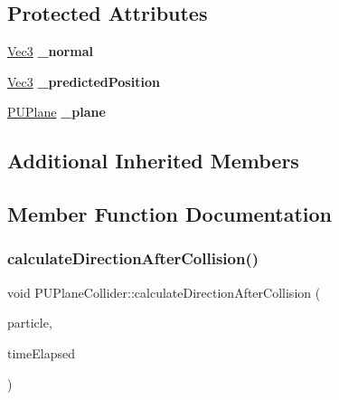 \subsection*{Protected Attributes}
\begin{DoxyCompactItemize}
\item 
\mbox{\label{classPUPlaneCollider_a709b66680d5834f6a34ff36afb84b3ce}} 
\hyperlink{classVec3}{Vec3} {\bfseries \+\_\+normal}
\item 
\mbox{\label{classPUPlaneCollider_a73019b39b34812c43d5353cbd918e3fe}} 
\hyperlink{classVec3}{Vec3} {\bfseries \+\_\+predicted\+Position}
\item 
\mbox{\label{classPUPlaneCollider_ae102585a363636619a848ddfe4a886dd}} 
\hyperlink{classPUPlane}{P\+U\+Plane} {\bfseries \+\_\+plane}
\end{DoxyCompactItemize}
\subsection*{Additional Inherited Members}


\subsection{Member Function Documentation}
\mbox{\label{classPUPlaneCollider_ae1db8e838bd51116e32d02859216f384}} 
\subsubsection{\texorpdfstring{calculate\+Direction\+After\+Collision()}{calculateDirectionAfterCollision()}}
{\footnotesize\ttfamily void P\+U\+Plane\+Collider\+::calculate\+Direction\+After\+Collision (\begin{DoxyParamCaption}\item[{\hyperlink{structPUParticle3D}{P\+U\+Particle3D} $\ast$}]{particle,  }\item[{float}]{time\+Elapsed }\end{DoxyParamCaption})}

